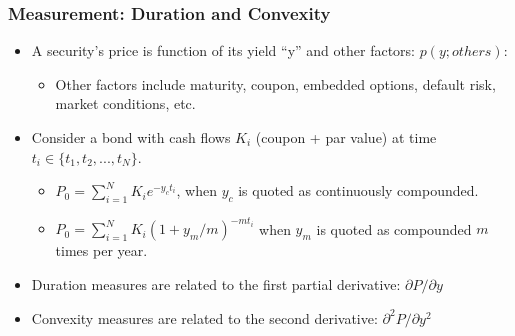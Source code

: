 \documentclass[10pt]{beamer}
\begin{document}
\begin{frame}
	\frametitle{Measurement: Duration and Convexity}
	
	\begin{itemize} \itemsep15pt
		\item A security’s price is function of its yield ``y'' and other factors: $ p(y; others)$:
		\begin{itemize}
			\item Other factors include maturity, coupon, embedded options, default risk, market
			conditions, etc.
		\end{itemize}
		
		\item Consider a bond with cash flows $K_{i}$ (coupon + par value) at time $t_i \in \{t_1, t_2, ..., t_N \}$.
		
		\begin{itemize}
			\item $P_0 = \sum_{i=1}^{N} K_i e^{-y_c t_i}$, when $y_c$ is quoted as continuously compounded.
			
			\item $P_0= \sum_{i=1}^{N} K_i (1+y_m/m)^{-mt_i} $ when $y_m$ is quoted as compounded $m$ times per year.
			
		\end{itemize}
		
		
		
		\item Duration measures are related to the first partial derivative: $\partial P / \partial y $
		
		\item Convexity measures are related to the second derivative: $ \partial^2 P / \partial y^2 $
		
	\end{itemize}
	
\end{frame}
\end{document}
